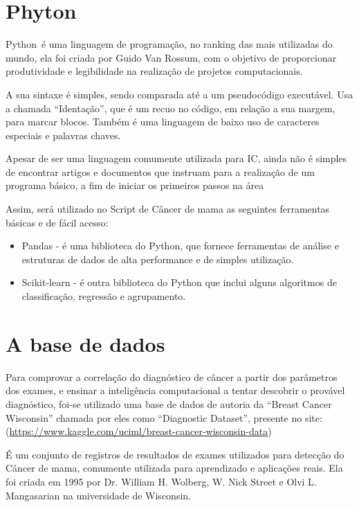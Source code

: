 \section{\textbf{Phyton}}

Python é uma linguagem de programação, no ranking das mais utilizadas do mundo, ela foi criada por Guido Van Rossum,
com o objetivo de proporcionar produtividade e legibilidade na realização de projetos computacionais. \cite{PYTHON}

A sua sintaxe é simples, sendo comparada até a um pseudocódigo executável.
Usa a chamada “Identação”, que é um recuo no código, em relação a sua margem, para marcar blocos.
Também é uma linguagem de baixo uso de caracteres especiais e palavras chaves.

Apesar de ser uma linguagem comumente utilizada para IC,
ainda não é simples de encontrar artigos e documentos que instruam para a realização de um programa básico,
a fim de iniciar os primeiros passos na área

Assim, será utilizado no Script de Câncer de mama as seguintes ferramentas básicas e de fácil acesso:

\begin{itemize}
\item Pandas - é uma biblioteca do Python,
  que fornece ferramentas de análise e estruturas de dados de alta performance e de simples utilização.\cite{PANDAS}
\item Scikit-learn - é outra biblioteca do Python que inclui alguns algoritmos de classificação, regressão e agrupamento.\cite{SCIKIT}
\end{itemize}

\section{\textbf{A base de dados}}

Para comprovar a correlação do diagnóstico de câncer a partir dos parâmetros dos exames,
e ensinar a inteligência computacional a tentar descobrir o provável diagnóstico,
foi-se utilizado uma base de dados de autoria da “Breast Cancer Wisconsin” chamada por eles como “Diagnostic Dataset”, presente no site:
(\url{https://www.kaggle.com/uciml/breast-cancer-wisconsin-data})\cite{BREASTCANCER}

É um conjunto de registros de resultados de exames utilizados para detecção do Câncer de mama,
comumente utilizada para aprendizado e aplicações reais.
Ela foi criada em 1995 por Dr. William H. Wolberg, W. Nick Street e Olvi L. Mangasarian na universidade de Wisconsin.

